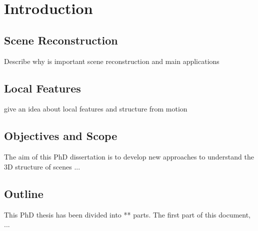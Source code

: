 \graphicspath{{./main/2_introduction/figures/}}

\chapter{Introduction}
\label{chap:intro}


\section{Scene Reconstruction}

Describe why is important scene reconstruction and main applications

\section{Local Features}

give an idea about local features and structure from motion

\section{Objectives and Scope} 

The aim of this PhD dissertation is to develop new approaches to understand the 3D structure of scenes ...

\section{Outline}

This PhD thesis has been divided into ** parts. The first part of this document, ...